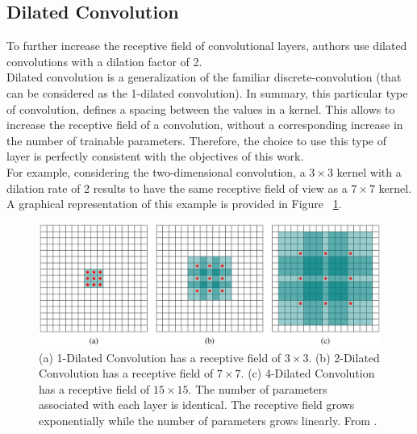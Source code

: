 \subsection{Dilated Convolution} \label{dilated_conv}
\noindent To further increase the receptive field of convolutional layers, authors use dilated convolutions with a dilation factor of 2. \\
Dilated convolution \cite{yu2015multi} is a generalization of the familiar discrete-convolution (that can be considered as the 1-dilated convolution). In summary, this particular type of convolution, defines a spacing between the values in a kernel. This allows to increase the receptive field of a convolution, without a corresponding increase in the number of trainable parameters. Therefore, the choice to use this type of layer is perfectly consistent with the objectives of this work.\\
For example, considering the two-dimensional convolution, a $3 \times 3$ kernel with a dilation rate of 2 results to have the same receptive field of view as a $7 \times 7$ kernel. A graphical representation of this example is provided in Figure ~\ref{fig:dilated_conv}.

\begin{figure}[H]
	\begin{center}
		\includegraphics[scale=.21]{img/dilated_conv.png}
		\captionsetup{margin=2cm}
		\caption{(a) 1-Dilated Convolution has a receptive field of $3 \times 3$. (b) 2-Dilated Convolution has a receptive field of $7 \times 7$. (c) 4-Dilated Convolution has a receptive field of $15 \times 15$. The number of parameters associated with each layer is identical. The receptive field grows exponentially while the number of parameters grows linearly. From \cite{yu2015multi}.}
		\label{fig:dilated_conv}
	\end{center}
\end{figure}

